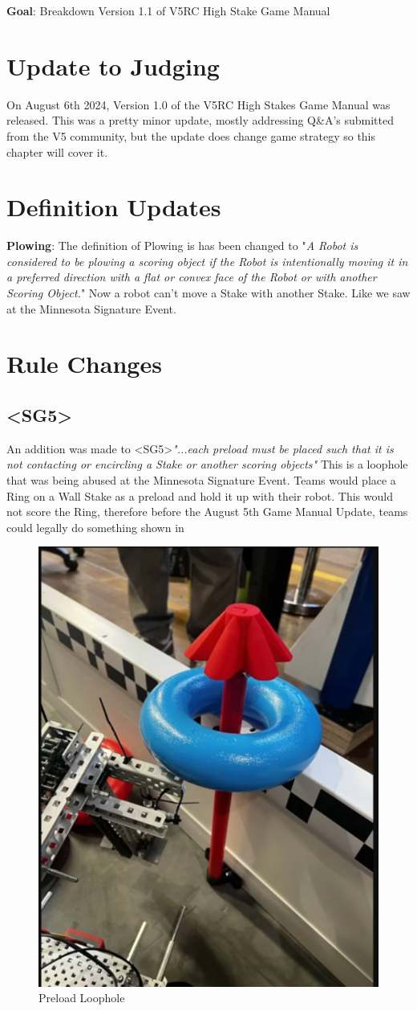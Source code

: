 \textbf{Goal}: Breakdown Version 1.1 of V5RC High Stake Game Manual
\section*{Update to Judging}
On August 6th 2024, Version 1.0 of the V5RC High Stakes Game Manual was released. This was a pretty minor update, mostly addressing Q\&A's submitted from the V5 community, but the update does change game strategy so this chapter will cover it.
\section*{Definition Updates}
\textbf{Plowing}: The definition of Plowing is has been changed to "\textit{A Robot is considered to be plowing a scoring object if the Robot is intentionally moving it in a preferred direction with a flat or convex face of the Robot or with another Scoring Object.}" Now a robot can't move a Stake with another Stake. Like we saw at the Minnesota Signature Event.
\section*{Rule Changes}
\subsection*{\textless SG5\textgreater}
An addition was made to \textless SG5\textgreater  \textit{"...each preload must be placed such that it is not contacting or encircling a Stake or another scoring objects"}
This is a loophole that was being abused at the Minnesota Signature Event. Teams would place a Ring on a Wall Stake as a preload and hold it up with their robot. This would not score the Ring, therefore before the August 5th Game Manual Update, teams could legally do something shown in 
\begin{figure}
    \centering
    \includegraphics[width=0.5\linewidth]{images/Preload.png}
    \caption{Preload Loophole}
    \label{fig:Preload}
\end{figure}
